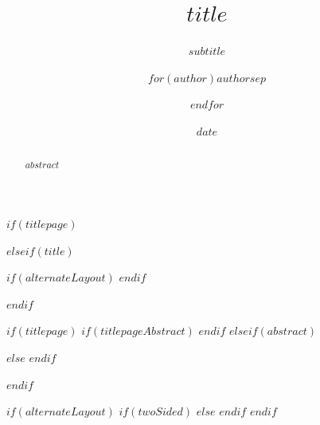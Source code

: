 \documentclass[$if(fontSize)$$fontSize$,%
	$if(language)$$language$,$else$english,$endif$%
	$if(paperSize)$$paperSize$,$else$ a4paper,%
	$endif$$if(classOptions)$$classOptions$,$endif$%
	$if(twoSided)$twoside,$endif$%
	$if(titlepage)$titlepage,$endif$%
	$if(centerEqs)$$else$fleqn$endif$]{$if(documentClass)$%
		$documentClass$$else$article$endif$}
\title{$title$}
\subtitle{$subtitle$}
\author{$for(author)$$author$$sep$ \and $endfor$}
\date{$date$}
\def\localDir{/home/pines/.pandoc/quetzalcoatl}
\def\packageDir{\localDir/packages}
\newcommand{\QuetzalAbstract}{{$abstract$}}
\renewcommand\abstractname{\sffamily $abstractName$}
\renewcommand\abstractname{\sffamily Abstract}
\begin{document}
$if(titlepage)$


$elseif(title)$
    	\maketitle
        $if(alternateLayout)$
            \thispagestyle{fancy}
        $endif$

$endif$


$if(titlepage)$
    $if(titlepageAbstract)$
    $endif$
$elseif(abstract)$
    \begin{abstract}
        \begin{abstractBox}
            \QuetzalAbstract
        \end{abstractBox}
    \end{abstract}
$else$
$endif$











$endif$
\saythanks

$if(alternateLayout)$
    \fancyhf{}
    $if(twoSided)$
    $else$
        \SetBgContents{\color{black}\rule{.4pt}{\textheight + 2\headsep + 0.25pt - 0.5\footskip}}
        \SetBgVshift{\headsep}
    $endif$
    \renewcommand{\headrulewidth}{0.0pt}
    \renewcommand{\footrulewidth}{0.4pt}
    \renewcommand{\footrule}{{\rule{\textwidth + 0.5\marginparsep}{\footrulewidth}}}
    \fancyfoot[R]{\sffamily{\thepage}}
$endif$
 
\end{document}
